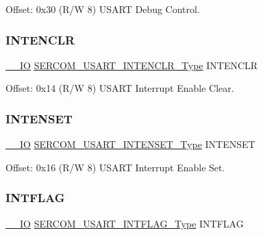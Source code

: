 Offset\+: 0x30 (R/W 8) U\+S\+A\+RT Debug Control. 

\mbox{\label{struct_sercom_usart_a848eefa4260bacb6ddba4f66bed40c6a}} 
\subsubsection{\texorpdfstring{INTENCLR}{INTENCLR}}
{\footnotesize\ttfamily \mbox{\hyperlink{core__cm0plus_8h_aec43007d9998a0a0e01faede4133d6be}{\+\_\+\+\_\+\+IO}} \mbox{\hyperlink{union_s_e_r_c_o_m___u_s_a_r_t___i_n_t_e_n_c_l_r___type}{S\+E\+R\+C\+O\+M\+\_\+\+U\+S\+A\+R\+T\+\_\+\+I\+N\+T\+E\+N\+C\+L\+R\+\_\+\+Type}} I\+N\+T\+E\+N\+C\+LR}



Offset\+: 0x14 (R/W 8) U\+S\+A\+RT Interrupt Enable Clear. 

\mbox{\label{struct_sercom_usart_aceb9c7f6f8de52cbb4da72038488c26c}} 
\subsubsection{\texorpdfstring{INTENSET}{INTENSET}}
{\footnotesize\ttfamily \mbox{\hyperlink{core__cm0plus_8h_aec43007d9998a0a0e01faede4133d6be}{\+\_\+\+\_\+\+IO}} \mbox{\hyperlink{union_s_e_r_c_o_m___u_s_a_r_t___i_n_t_e_n_s_e_t___type}{S\+E\+R\+C\+O\+M\+\_\+\+U\+S\+A\+R\+T\+\_\+\+I\+N\+T\+E\+N\+S\+E\+T\+\_\+\+Type}} I\+N\+T\+E\+N\+S\+ET}



Offset\+: 0x16 (R/W 8) U\+S\+A\+RT Interrupt Enable Set. 

\mbox{\label{struct_sercom_usart_a66228492849f2a35ebb5390c3f7e4c3e}} 
\subsubsection{\texorpdfstring{INTFLAG}{INTFLAG}}
{\footnotesize\ttfamily \mbox{\hyperlink{core__cm0plus_8h_aec43007d9998a0a0e01faede4133d6be}{\+\_\+\+\_\+\+IO}} \mbox{\hyperlink{union_s_e_r_c_o_m___u_s_a_r_t___i_n_t_f_l_a_g___type}{S\+E\+R\+C\+O\+M\+\_\+\+U\+S\+A\+R\+T\+\_\+\+I\+N\+T\+F\+L\+A\+G\+\_\+\+Type}} I\+N\+T\+F\+L\+AG}




